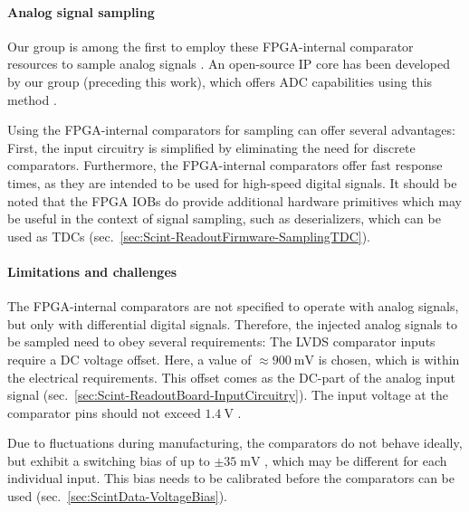 \paragraph{Analog signal sampling}
Our group is among the first to employ these \ac{FPGA}-internal comparator resources to sample analog signals \cite{FPGA-MVT-Eliseev,FPGA-MVT-Xi}. An open-source \ac{IP core} has been developed by our group (preceding this work), which offers \ac{ADC} capabilities using this method \cite{FPGA-MVT-Eliseev}.
\par Using the \ac{FPGA}-internal comparators for sampling can offer several advantages: First, the input circuitry is simplified by eliminating the need for discrete comparators. Furthermore, the \ac{FPGA}-internal comparators offer fast response times, as they are intended to be used for high-speed digital signals. It should be noted that the \ac{FPGA} \acp{IOB} do provide additional hardware primitives which may be useful in the context of signal sampling, such as deserializers, which can be used as \acp{TDC} (sec.\ \ref{sec:Scint-ReadoutFirmware-SamplingTDC}).
\paragraph{Limitations and challenges}
The \ac{FPGA}-internal comparators are not specified to operate with analog signals, but only with differential digital signals. Therefore, the injected analog signals to be sampled need to obey several requirements: The \ac{LVDS} comparator inputs require a DC voltage offset. Here, a value of $\approx\SI{900}{\milli\volt}$ is chosen, which is within the electrical requirements. This offset comes as the DC-part of the analog input signal (sec.\ \ref{sec:Scint-ReadoutBoard-InputCircuitry}). The input voltage at the comparator pins should not exceed $\SI{1.4}{\volt}$ \cite{UltraScale-FPGA-SelectIO-Switching}.
\par Due to fluctuations during manufacturing, the comparators do not behave ideally, but exhibit a switching bias of up to $\pm 35\;\si{\milli\volt}$ \cite{UltraScale-FPGA-SelectIO-Resources}, which may be different for each individual input. This bias needs to be calibrated before the comparators can be used (sec.\ \ref{sec:ScintData-VoltageBias}).

